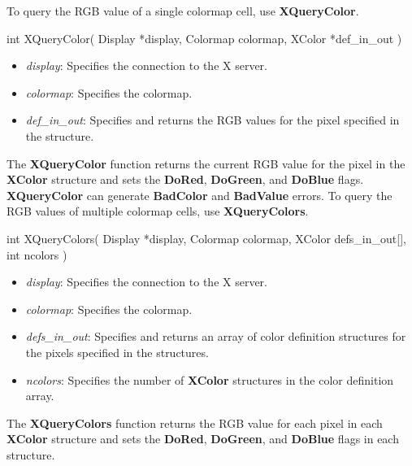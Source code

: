 \documentclass{report}
\begin{document}
\begin{itemize}
            \bigbreak \noindent
            To query the RGB value of a single colormap cell, use \textbf{XQueryColor}.
            \bigbreak \noindent
            \begin{cppcode}
                int XQueryColor(
                    Display *display,
                    Colormap colormap,
                    XColor *def_in_out
                )
            \end{cppcode}
            \begin{itemize}
                \item \textit{display}: Specifies the connection to the X server.
                \item \textit{colormap}: Specifies the colormap.
                \item \textit{def\_in\_out}: Specifies and returns the RGB values for the pixel specified in the structure.
            \end{itemize}
            \noindent
            The \textbf{XQueryColor} function returns the current RGB value for the pixel in the \textbf{XColor} structure and sets the \textbf{DoRed}, \textbf{DoGreen}, and \textbf{DoBlue} flags.
            \bigbreak \noindent
            \textbf{XQueryColor} can generate \textbf{BadColor} and \textbf{BadValue} errors.
            \bigbreak \noindent
            To query the RGB values of multiple colormap cells, use \textbf{XQueryColors}.
            \bigbreak \noindent 
            \begin{cppcode}
                int XQueryColors(
                    Display *display,
                    Colormap colormap,
                    XColor defs_in_out[],
                    int ncolors
                )
            \end{cppcode}
            \begin{itemize}
                \item \textit{display}: Specifies the connection to the X server.
                \item \textit{colormap}: Specifies the colormap.
                \item \textit{defs\_in\_out}: Specifies and returns an array of color definition structures for the pixels specified in the structures.
                \item \textit{ncolors}: Specifies the number of \textbf{XColor} structures in the color definition array.
            \end{itemize}
            \noindent
            The \textbf{XQueryColors} function returns the RGB value for each pixel in each \textbf{XColor} structure and sets the \textbf{DoRed}, \textbf{DoGreen}, and \textbf{DoBlue} flags in each structure.

\end{itemize}
\end{document}
